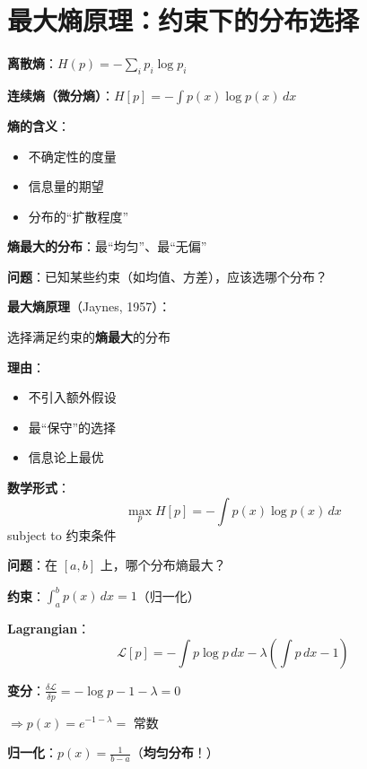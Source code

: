 \documentclass[12pt, a4paper]{ctexart}
\begin{document}
\section{最大熵原理：约束下的分布选择}

\begin{blackboard}[熵的回顾]

\textbf{离散熵}：$H(p) = -\sum_i p_i \log p_i$

\textbf{连续熵（微分熵）}：$H[p] = -\int p(x) \log p(x) \, dx$

\textbf{熵的含义}：
\begin{itemize}
    \item 不确定性的度量
    \item 信息量的期望
    \item 分布的``扩散程度''
\end{itemize}

\textbf{熵最大的分布}：最``均匀''、最``无偏''

\end{blackboard}

\begin{blackboard}[最大熵原理]

\textbf{问题}：已知某些约束（如均值、方差），应该选哪个分布？

\textbf{最大熵原理}（Jaynes, 1957）：

选择满足约束的\textbf{熵最大}的分布

\textbf{理由}：
\begin{itemize}
    \item 不引入额外假设
    \item 最``保守''的选择
    \item 信息论上最优
\end{itemize}

\textbf{数学形式}：
\[
\max_{p} H[p] = -\int p(x) \log p(x) \, dx
\]
subject to 约束条件

\end{blackboard}

\begin{blackboard}[例1：无约束最大熵]

\textbf{问题}：在 $[a, b]$ 上，哪个分布熵最大？

\textbf{约束}：$\int_a^b p(x) \, dx = 1$（归一化）

\textbf{Lagrangian}：
\[
\mathcal{L}[p] = -\int p \log p \, dx - \lambda \left( \int p \, dx - 1 \right)
\]

\textbf{变分}：$\frac{\delta \mathcal{L}}{\delta p} = -\log p - 1 - \lambda = 0$

$\Rightarrow p(x) = e^{-1-\lambda} = $ 常数

\textbf{归一化}：$p(x) = \frac{1}{b-a}$（\textbf{均匀分布}！）

\end{blackboard}
\end{document}
